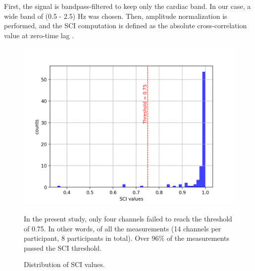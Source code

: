 First, the signal is bandpass-filtered to keep only the cardiac band. In our case, a wide band of (0.5 - 2.5) Hz was chosen. Then, amplitude normalization is performed, and the SCI computation is defined as the absolute cross-correlation value at zero-time lag \citep {Pollonini2013}.


\begin{figure}[H]
  \centering
    \includegraphics[scale=.75]{bilder/SCI_hist.png}
  \caption{Distribution of SCI values.}
   \label{fig:somesignal}
    \medskip
     \small {In the present study, only four channels failed to reach the threshold of 0.75. In other words, of all the measurements (14 channels per participant, 8 participants in total). Over 96\% of the measurements passed the SCI threshold.}
 
\end{figure}




